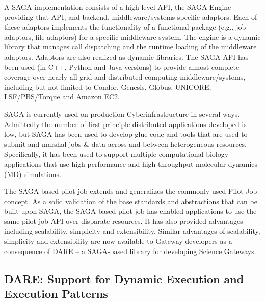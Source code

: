 \documentclass[]{svjour3}
\begin{document}
A SAGA implementation consists of a high-level API, the SAGA
Engine providing that API, and backend, middleware/systems specific
adaptors. Each of these adaptors implements the functionality of
a functional package (e.g., job adaptors, file adaptors) for a
specific middleware system. The engine is a dynamic library that
manages call dispatching and the runtime loading of the middleware
adaptors. Adaptors are also realized as dynamic libraries. The SAGA
API has been used (in C++, Python and Java versions) to provide almost
complete coverage over nearly all grid and distributed computing
middleware/systems, including but not limited to Condor, Genesis,
Globus, UNICORE, LSF/PBS/Torque and Amazon EC2.

SAGA is currently used on production Cyberinfrastructure in several ways.
Admittedly the number of first-principle distributed applications developed is
low, but SAGA has been used to develop glue-code and tools that are
used to submit and marshal jobs \& data across and between
heterogeneous resources. Specifically, it has been used to support
multiple computational biology applications that use high-performance
and high-throughput molecular dynamics (MD) simulations.



The SAGA-based pilot-job extends and generalizes the commonly used Pilot-Job concept.
As a solid validation of the base standards and abstractions that
can be built upon SAGA, the SAGA-based pilot job has enabled applications to use the same
pilot-job API over disparate resources. It has also provided advantages including
scalability, simplicity and extensibility. Similar advantages of scalability, simplicity and
extensibility are now available to Gateway developers as a consequence of
DARE – a SAGA-based library for developing Science Gateways.


\subsection{DARE: Support for Dynamic Execution and Execution Patterns}
\end{document}
